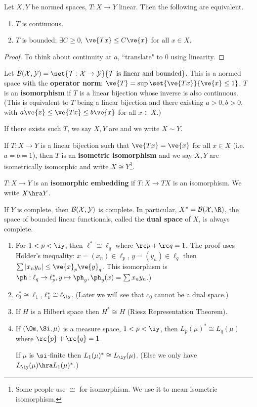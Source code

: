 \begin{pr}
Let $X,Y$ be normed spaces, $T:X\to Y$ linear. Then the following are equivalent.
\begin{enumerate}
\item
$T$ is continuous.
\item
$T$ is bounded: $\exists C\ge 0$, $\ve{Tx}\le C\ve{x}$ for all $x\in X$.
\end{enumerate}
\end{pr}
\begin{proof}
To think about continuity at $a$, ``translate" to 0 using linearity.
\end{proof}

\begin{df}
Let $\cal B(X,Y)=\set{T:X\to Y}{T\text{ is linear and bounded}}$. This is a normed space with the \textbf{operator norm}: $\ve{T}=\sup\set{\ve{Tx}}{\ve{x}\le 1}$. $T$ is an \textbf{isomorphism} if $T$ is a linear bijection whose inverse is also continuous. (This is equivalent to $T$ being a linear bijection and there existing $a>0,b>0$, with $a\ve{x}\le \ve{Tx}\le b\ve{x}$ for all $x\in X$.)

If there exists such $T$, we say $X,Y$ are  and we write $X\sim Y$.

If $T:X\to Y$ is a linear bijection such that $\ve{Tx}=\ve{x}$ for all $x\in X$ (i.e. $a=b=1$), then $T$ is an \textbf{isometric isomorphism} and we say $X,Y$ are isometrically isomorphic and write $X\cong Y$\footnote{Some people use $\cong$ for isomorphism. We use it to mean isometric isomorphism.}.

$T:X\to Y$ is an \textbf{isomorphic embedding} if $T:X\to TX$ is an isomorphism. We write $X\hra Y$.
\end{df}
\begin{pr}
If $Y$ is complete, then $\cal B(X,Y)$ is complete. In particular, $X^*=\cal B(X,\R)$, the space of bounded linear functionals, called the \textbf{dual space} of $X$, is always complete.
\end{pr}
\begin{ex}
\begin{enumerate}
\item
For $1<p<\iy$, then $\ell^*\cong \ell_q$ where $\rc p+\rc q=1$. The proof uses H\"older's inequality: $x=(x_n)\in \ell_p$, $y=(y_n)\in \ell_q$ then $\sum|x_ny_n|\le \ve{x}_p\ve{y}_q$. This isomorphism is $\ph:\ell_q\to \ell_p^*,y\mapsto \ph_y, \ph_y(x)=\sum x_ny_n$.)
\item
$c_0^*\cong \ell_1$, $\ell_1^*\cong \ell_{\iy}$. 
(Later we will see that $c_0$ cannot be a dual space.)
\item 
If $H$ is a Hilbert space then $H^*\cong H$ (Riesz Representation Theorem).
\item
If $(\Om,\Si,\mu)$ is a measure space, $1<p<\iy$, then $L_p(\mu)^*\cong L_q(\mu)$ where $\rc{p}+\rc{q}=1$.

If $\mu$ is $\si$-finite then $L_1(\mu)^*\cong L_{\iy}(\mu)$.
(Else we only have $L_{\iy}(\mu)\hra L_1(\mu)^*$.)
\end{enumerate}
\end{ex}

